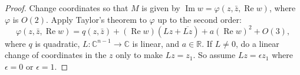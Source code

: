 \documentclass[12pt,openany]{book}
\renewcommand{\Re}{\operatorname{Re}}
\renewcommand{\Im}{\operatorname{Im}}
\newcommand{\C}{{\mathbb{C}}}
\newcommand{\R}{{\mathbb{R}}}
\theoremstyle{plain}
\theoremstyle{remark}
\theoremstyle{definition}
\theoremstyle{exercise}
\theoremstyle{example}
\begin{document}
\begin{proof}
Change coordinates so that $M$ is given by
$\Im w = \varphi(z,\bar{z},\Re w)$,  where $\varphi$ is $O(2)$.
Apply Taylor's theorem to $\varphi$ up to the second order:
\begin{equation*}
\varphi(z,\bar{z},\Re w) = q(z,\bar{z}) + (\Re w) (Lz + \overline{Lz}) +
a {(\Re w)}^2 +
O(3) ,
\end{equation*}
where $q$ is quadratic, $L \colon \C^{n-1} \to \C$ is linear, and $a \in \R$.
If $L
\not= 0$, do
a linear change of coordinates in the $z$ only to make $Lz = z_1$.  So
assume $Lz = \epsilon z_1$ where $\epsilon = 0$ or $\epsilon =
1$. 


\end{proof}
\end{document}
